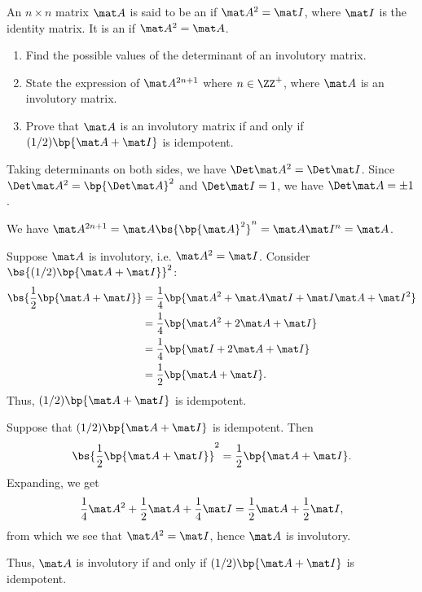 \begin{problem}
    An $n \times n$ matrix $\mat A$ is said to be an  if $\mat A^2 = \mat I$, where $\mat I$ is the identity matrix. It is an  if $\mat A^2 = \mat A$.

    \begin{enumerate}
        \item Find the possible values of the determinant of an involutory matrix.
        \item State the expression of $\mat A^{2n+1}$ where $n \in \ZZ^+$, where $\mat A$ is an involutory matrix.
        \item Prove that $\mat A$ is an involutory matrix if and only if $(1/2)\bp{\mat A + \mat I}$ is idempotent.
    \end{enumerate}
\end{problem}
\begin{solution}
    \begin{ppart}
        Taking determinants on both sides, we have $\Det \mat A^2 = \Det \mat I$. Since $\Det \mat A^2 = \bp{\Det \mat A}^2$ and $\Det \mat I = 1$, we have $\Det \mat A = \pm 1$.
    \end{ppart}
    \begin{ppart}
        We have $\mat A^{2n+1} = \mat A \bs{\bp{\mat A}^{2}}^{n} = \mat A \mat I^n = \mat A$.
    \end{ppart}
    \begin{ppart}
        Suppose $\mat A$ is involutory, i.e. $\mat A^2 = \mat I$. Consider $\bs{(1/2)\bp{\mat A + \mat I}}^2$:
        \begin{align*}
            \bs{\frac12 \bp{\mat A + \mat I}} &= \frac14 \bp{\mat A^2 + \mat A \mat I + \mat I \mat A + \mat I^2}\\
            &= \frac14 \bp{\mat A^2 + 2\mat A + \mat I}\\
            &= \frac14 \bp{\mat I + 2\mat A + \mat I}\\
            &= \frac12 \bp{\mat A + \mat I}.    
        \end{align*}
        Thus, $(1/2)\bp{\mat A + \mat I}$ is idempotent.

        Suppose that $(1/2)\bp{\mat A + \mat I}$ is idempotent. Then \[\bs{\frac12 \bp{\mat A + \mat I}}^2 = \frac12 \bp{\mat A + \mat I}.\] Expanding, we get \[\frac14 \mat A^2 + \frac12 \mat A + \frac 14 \mat I = \frac12 \mat A + \frac12 \mat I,\] from which we see that $\mat A^2 = \mat I$, hence $\mat A$ is involutory.

        Thus, $\mat A$ is involutory if and only if $(1/2)\bp{\mat A + \mat I}$ is idempotent.
    \end{ppart}
\end{solution}

